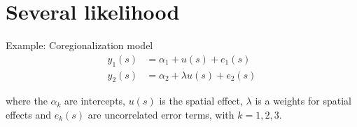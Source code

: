 \documentclass[
  ignorenonframetext,
]{beamer}
\begin{document}
\hypertarget{several-likelihood}{%
\section{Several likelihood}\label{several-likelihood}}

\begin{frame}{Example: Coregionalization model}
\protect\hypertarget{example-coregionalization-model}{}
\[
\begin{aligned}
y_1(s) & =\alpha_1 + u(s) +e_1(s)\\
y_2(s) & =\alpha_2+\lambda u(s) + e_2(s)
\end{aligned}
\]

where the \(\alpha_k\) are intercepts, \(u(s)\) is the spatial effect,
\(\lambda\) is a weights for spatial effects and \(e_k(s)\) are
uncorrelated error terms, with \(k=1,2,3\).
\end{frame}
\end{document}

